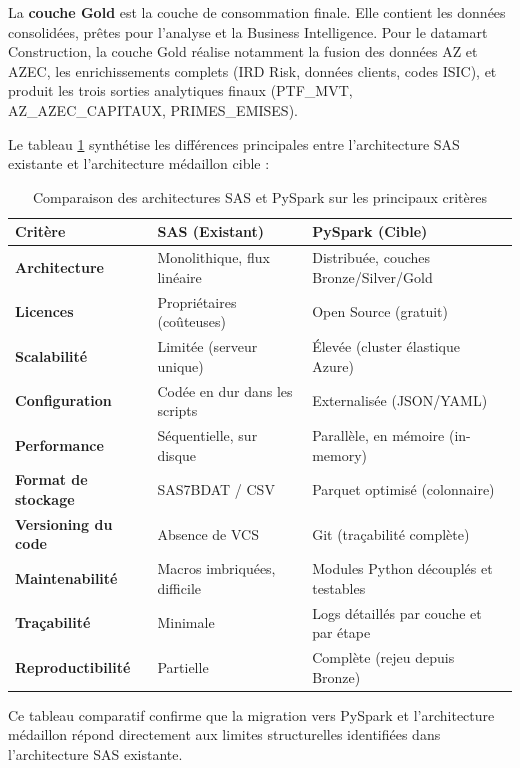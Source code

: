 La \textbf{couche Gold} est la couche de consommation finale. Elle contient les données consolidées, prêtes pour l'analyse et la Business Intelligence. Pour le datamart Construction, la couche Gold réalise notamment la fusion des données AZ et AZEC, les enrichissements complets (IRD Risk, données clients, codes ISIC), et produit les trois sorties analytiques finaux (PTF\_MVT, AZ\_AZEC\_CAPITAUX, PRIMES\_EMISES).

Le tableau \ref{tab:comparison} synthétise les différences principales entre l'architecture SAS existante et l'architecture médaillon cible :

\begin{table}[H]
    \centering
    \caption{Comparaison des architectures SAS et PySpark sur les principaux critères}
    \label{tab:comparison}
    \vspace{0.2cm}
    \begin{tabularx}{\textwidth}{|l|X|X|}
        \hline
        \textbf{Critère} & \textbf{SAS (Existant)} & \textbf{PySpark (Cible)} \\
        \hline
        \textbf{Architecture} & Monolithique, flux linéaire & Distribuée, couches Bronze/Silver/Gold \\
        \hline
        \textbf{Licences} & Propriétaires (coûteuses) & Open Source (gratuit) \\
        \hline
        \textbf{Scalabilité} & Limitée (serveur unique) & Élevée (cluster élastique Azure) \\
        \hline
        \textbf{Configuration} & Codée en dur dans les scripts & Externalisée (JSON/YAML) \\
        \hline
        \textbf{Performance} & Séquentielle, sur disque & Parallèle, en mémoire (in-memory) \\
        \hline
        \textbf{Format de stockage} & SAS7BDAT / CSV & Parquet optimisé (colonnaire) \\
        \hline
        \textbf{Versioning du code} & Absence de VCS & Git (traçabilité complète) \\
        \hline
        \textbf{Maintenabilité} & Macros imbriquées, difficile & Modules Python découplés et testables \\
        \hline
        \textbf{Traçabilité} & Minimale & Logs détaillés par couche et par étape \\
        \hline
        \textbf{Reproductibilité} & Partielle & Complète (rejeu depuis Bronze) \\
        \hline
    \end{tabularx}
\end{table}

Ce tableau comparatif confirme que la migration vers PySpark et l'architecture médaillon répond directement aux limites structurelles identifiées dans l'architecture SAS existante.
